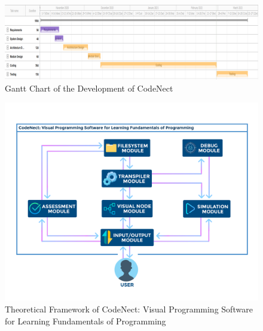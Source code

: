 \begin{doublespace}
\begin{center}
		\clearpage
		\null\vfill
		\begin{figure}[H]
			\centering
			\includegraphics[width=0.8\textheight,angle=90]{figures/gantt_chart.png}
			\caption[Gantt Chart]{Gantt Chart of the Development of CodeNect}
			\label{fig:gantt_chart}
		\end{figure}
		\vfill

		\clearpage
		\null\vfill
		\begin{figure}[H]
			\centering
			\includegraphics[width=\textwidth]{figures/theoretical_framework.png}
			\caption[Theoretical Framework]{Theoretical Framework of CodeNect: Visual Programming Software
			for Learning Fundamentals of Programming}
			\label{fig:theoretical_framework}
		\end{figure}
		\vfill

	\end{center}
\end{doublespace}
